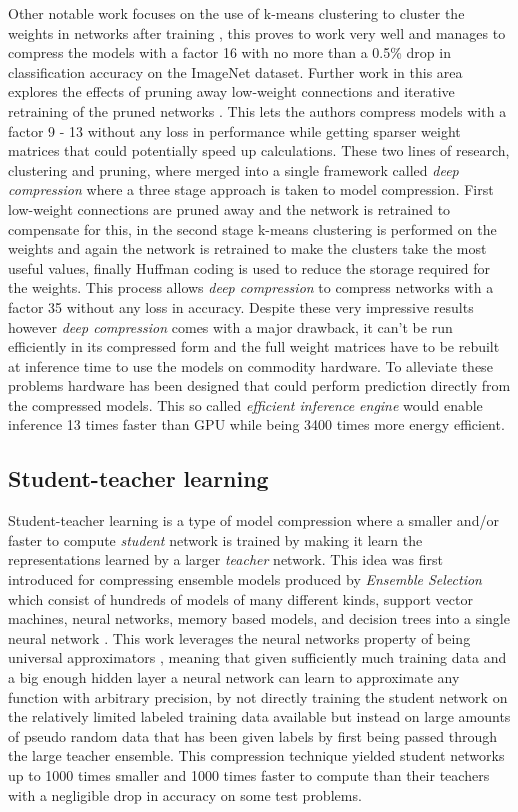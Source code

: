 \documentclass{kththesis}
\newcommand{\bibentry}[1]{\parencite{#1}}
\begin{document}
Other notable work focuses on the use of k-means clustering to cluster the weights in networks after training \bibentry{gong2014compressing}, this proves to work very well and manages to compress the models with a factor 16 with no more than a 0.5\% drop in classification accuracy on the ImageNet dataset. Further work in this area explores the effects of pruning away low-weight connections and iterative retraining of the pruned networks \bibentry{han2015learning}. This lets the authors compress models with a factor 9 - 13 without any loss in performance while getting sparser weight matrices that could potentially speed up calculations. These two lines of research, clustering and pruning, where merged into a single framework called \emph{deep compression} \bibentry{han2015deep} where a three stage approach is taken to model compression. First low-weight connections are pruned away and the network is retrained to compensate for this, in the second stage k-means clustering is performed on the weights and again the network is retrained to make the clusters take the most useful values, finally Huffman coding \bibentry{van1976construction} is used to reduce the storage required for the weights. This process allows \emph{deep compression} to compress networks with a factor 35 without any loss in accuracy. Despite these very impressive results however \emph{deep compression} comes with a major drawback, it can't be run efficiently in its compressed form and the full weight matrices have to be rebuilt at inference time to use the models on commodity hardware. To alleviate these problems hardware has been designed that could perform prediction directly from the compressed models. This so called \emph{efficient inference engine} \bibentry{han2016eie} would enable inference 13 times faster than GPU while being 3400 times more energy efficient.

\subsection{Student-teacher learning}
Student-teacher learning is a type of model compression where a smaller and/or faster to compute \emph{student} network is trained by making it learn the representations learned by a larger \emph{teacher} network. This idea was first introduced for compressing ensemble models produced by \emph{Ensemble Selection} \bibentry{caruana2004ensemble} which consist of hundreds of models of many different kinds, support vector machines, neural networks, memory based models, and decision trees into a single neural network \bibentry{bucilua2006model}. This work leverages the neural networks property of being universal approximators \bibentry{cybenko1989approximation}, meaning that given sufficiently much training data and a big enough hidden layer a neural network can learn to approximate any function with arbitrary precision, by not directly training the student network on the relatively limited labeled training data available but instead on large amounts of pseudo random data that has been given labels by first being passed through the large teacher ensemble. This compression technique yielded student networks up to 1000 times smaller and 1000 times faster to compute than  their teachers with a negligible drop in accuracy on some test problems.
\end{document}
